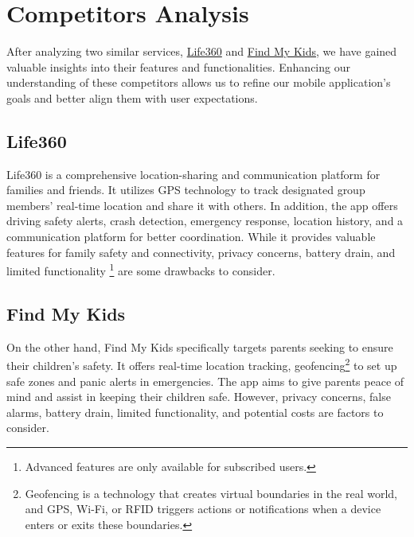 \section{Competitors Analysis}
After analyzing two similar services, \href{https://www.life360.com}{Life360} and \href{https://findmykids.org}{Find My Kids}, we have gained valuable insights into their features and functionalities. Enhancing our understanding of these competitors allows us to refine our mobile application's goals and better align them with user expectations.

\subsection{Life360}
Life360 is a comprehensive location-sharing and communication platform for families and friends. It utilizes GPS technology to track designated group members' real-time location and share it with others. In addition, the app offers driving safety alerts, crash detection, emergency response, location history, and a communication platform for better coordination. While it provides valuable features for family safety and connectivity, privacy concerns, battery drain, and limited functionality \footnote{Advanced features are only available for subscribed users.} are some drawbacks to consider.

\subsection{Find My Kids}
On the other hand, Find My Kids specifically targets parents seeking to ensure their children's safety. It offers real-time location tracking, geofencing\footnote{Geofencing is a technology that creates virtual boundaries in the real world, and GPS, Wi-Fi, or RFID triggers actions or notifications when a device enters or exits these boundaries.} to set up safe zones and panic alerts in emergencies. The app aims to give parents peace of mind and assist in keeping their children safe. However, privacy concerns, false alarms, battery drain, limited functionality, and potential costs are factors to consider.